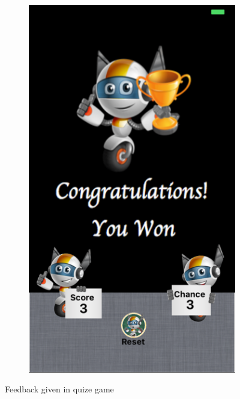 \begin{figure}[!hbt]
\begin{subfigure}{0.35\textwidth}
\caption{}
    \end{subfigure}\hspace{0.06\textwidth}
 \begin{subfigure}{0.35\textwidth}
\includegraphics[width=\textwidth]{feed2}
\caption{}
 \end{subfigure}\hspace{0.5\textwidth}
  \caption{Feedback given in quize game}
\end{figure}

